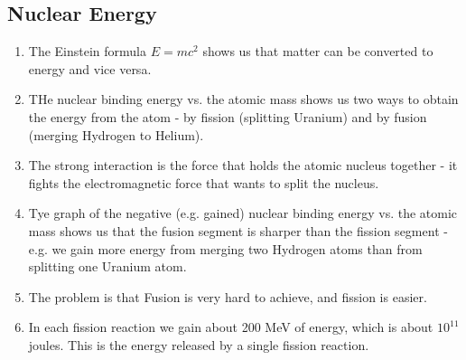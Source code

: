 \documentclass[11pt]{article}
\begin{document}
\subsection{Nuclear Energy}
\begin{enumerate}
    \item The Einstein formula $E=mc^2$ shows us that matter can be converted to energy and vice versa.
    \item THe nuclear binding energy vs. the atomic mass shows us two ways to obtain the energy from the atom - by fission (splitting Uranium) and by fusion (merging Hydrogen to Helium).
    \item The strong interaction is the force that holds the atomic nucleus together - it fights the electromagnetic force that wants to split the nucleus.
    \item Tye graph of the negative (e.g. gained) nuclear binding energy vs. the atomic mass shows us that the fusion segment is sharper than the fission segment - e.g. we gain more energy from merging two Hydrogen atoms than from splitting one Uranium atom.
    \item The problem is that Fusion is very hard to achieve, and fission is easier.
    \item In each fission reaction we gain about 200 MeV of energy, which is about $10^{11}$ joules. This is the energy released by a single fission reaction.
\end{enumerate}
\end{document}
